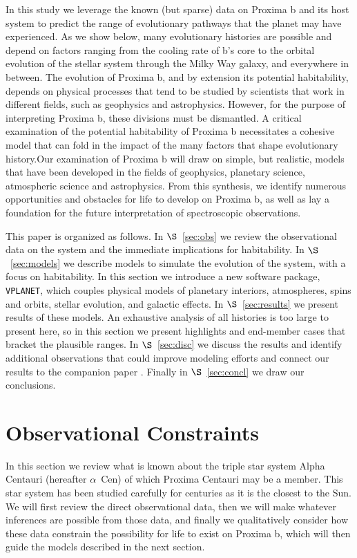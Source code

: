 \documentclass[preprint,12pt]{aastex}
\newcommand{\xxx}[1]{{\color{red} #1}} %
\def\acen{{$\alpha$~Cen}}
\def\vplanet{\texttt{\footnotesize{VPLANET}}\xspace}
\begin{document}
In this study we leverage the known (but sparse) data on Proxima b and
its host system to predict the range of evolutionary pathways that the
planet may have experienced. As we show below, many \xxx{evolutionary} histories are
possible and depend on factors ranging from the cooling rate of b's
core to the orbital evolution of the stellar system through the Milky
Way galaxy, and everywhere in between. The evolution of Proxima b, and by
extension its potential habitability, depends on physical processes
that tend to be studied by scientists that work in different
fields, such as geophysics and astrophysics. However, for the purpose
of interpreting Proxima b, these divisions must be dismantled. \xxx{A critical examination of the potential habitability of Proxima b necessitates
a cohesive model that can fold in the impact of the many factors that shape evolutionary
history.}Our examination of Proxima b will draw on simple, but realistic, models
that have been developed in the fields of geophysics, planetary
science, atmospheric science and astrophysics. From this synthesis, we
identify numerous opportunities and obstacles for life to develop on
Proxima b, as well as lay a foundation for the future interpretation
of spectroscopic observations.

This paper is organized as follows. In $\S$~\ref{sec:obs} we review
the observational data on the system and the immediate implications
for habitability. In $\S$~\ref{sec:models} we describe models to
simulate the evolution of the system, with a focus on habitability. In
this section we introduce a new software package, \vplanet, which
couples physical models of planetary interiors, atmospheres, spins and
orbits, stellar evolution, and galactic effects. In
$\S$~\ref{sec:results} we present results of these models. An
exhaustive analysis of all histories is too large to present here, so
in this section we present highlights and end-member cases that
bracket the plausible ranges. In $\S$~\ref{sec:disc} we discuss the
results and identify additional observations that could improve
modeling efforts and connect our results to the companion paper
\citep{Meadows16}. Finally in $\S$~\ref{sec:concl} we draw our
conclusions.

\section{Observational Constraints \label{sec:obs}}

In this section we review what is known about the triple star system
Alpha Centauri (hereafter \acen) of which Proxima Centauri may be a
member. This star system has been studied carefully for centuries as
it is the closest to the Sun. We will first review the direct
observational data, then we will make whatever inferences are possible
from those data, and finally we qualitatively consider how these data
constrain the possibility for life to exist on Proxima b, which will
then guide the models described in the next section.
\end{document}
